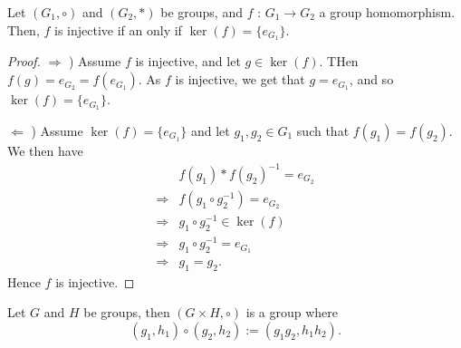 \documentclass[12pt]{article}
\begin{document}
\begin{theorem}
    Let \((G_1, \circ)\) and \((G_2, *)\) be groups, and \(f\) : \(G_1 \rightarrow G_2\) a group homomorphism. Then, \(f\) is injective if an only if \(\ker(f) = \{e_{G_1}\}\).
\end{theorem}

\begin{proof}
    \(\Longrightarrow\) ) Assume \(f\) is injective, and let \(g\in \ker(f)\). THen \(f(g) = e_{G_2} = f(e_{G_1})\). As \(f\) is injective, we get that \(g=e_{G_1}\), and so \(\ker(f)= \{e_{G_1}\}\). 

    \(\Longleftarrow\) ) Assume \(\ker(f) = \{e_{G_1}\}\) and let \(g_1, g_2\in G_1\) such that \(f(g_1) = f(g_2)\). We then have
    \begin{equation*}
        \begin{split}
            &f(g_1) * f(g_2)^{-1} = e_{G_2}\\
            \Longrightarrow & f(g_1\circ g_2^{-1}) = e_{G_2}\\
            \Longrightarrow & g_1 \circ g_2^{-1}\in \ker(f)\\
            \Longrightarrow & g_1\circ g_2^{-1} = e_{G_1}\\
            \Longrightarrow & g_1 = g_2.
        \end{split}
    \end{equation*}
    Hence \(f\) is injective.
\end{proof}

\begin{theorem}
    Let \(G\) and \(H\) be groups, then \((G\times H, \circ)\) is a group where
    \begin{equation*}
        (g_1, h_1)\circ(g_2, h_2) := (g_1g_2, h_1h_2).
    \end{equation*}
\end{theorem}
\end{document}
